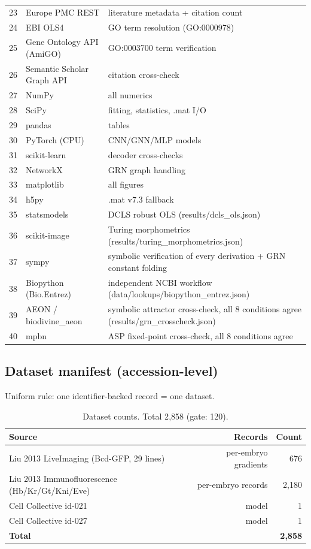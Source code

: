 \begin{table}[!htbp]
\begin{tabular}{clp{8.5cm}}
23 & Europe PMC REST & literature metadata + citation count \\
24 & EBI OLS4 & GO term resolution (GO:0000978) \\
25 & Gene Ontology API (AmiGO) & GO:0003700 term verification \\
26 & Semantic Scholar Graph API & citation cross-check \\
27 & NumPy & all numerics \\
28 & SciPy & fitting, statistics, .mat I/O \\
29 & pandas & tables \\
30 & PyTorch (CPU) & CNN/GNN/MLP models \\
31 & scikit-learn & decoder cross-checks \\
32 & NetworkX & GRN graph handling \\
33 & matplotlib & all figures \\
34 & h5py & .mat v7.3 fallback \\
35 & statsmodels & DCLS robust OLS (results/dcls\_ols.json) \\
36 & scikit-image & Turing morphometrics (results/turing\_morphometrics.json) \\
37 & sympy & symbolic verification of every derivation + GRN constant folding \\
38 & Biopython (Bio.Entrez) & independent NCBI workflow (data/lookups/biopython\_entrez.json) \\
39 & AEON / biodivine\_aeon & symbolic attractor cross-check, all 8 conditions agree (results/grn\_crosscheck.json) \\
40 & mpbn & ASP fixed-point cross-check, all 8 conditions agree \\
\bottomrule
\end{tabular}
\end{table}

\subsection{Dataset manifest (accession-level)}

Uniform rule: one identifier-backed record = one dataset.

\begin{table}[!htbp]
\centering
\caption{Dataset counts. Total 2{,}858 (gate: 120).}
\begin{tabular}{lrr}
\toprule
Source & Records & Count \\
\midrule
Liu 2013 LiveImaging (Bcd-GFP, 29 lines) & per-embryo gradients & 676 \\
Liu 2013 Immunofluorescence (Hb/Kr/Gt/Kni/Eve) & per-embryo records & 2{,}180 \\
Cell Collective id-021 & model & 1 \\
Cell Collective id-027 & model & 1 \\
\midrule
\textbf{Total} & & \textbf{2{,}858} \\
\bottomrule
\end{tabular}
\end{table}

